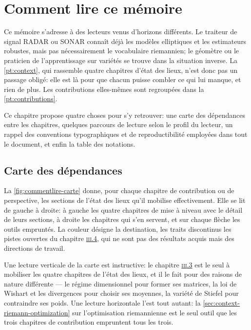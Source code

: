 
\chapter*{Comment lire ce mémoire}
\label{ch:commentlire}

Ce mémoire s'adresse à des lecteurs venus d'horizons différents. Le traiteur de
signal RADAR ou SONAR connaît déjà les modèles elliptiques et les estimateurs
robustes, mais pas nécessairement le vocabulaire riemannien; le géomètre ou le
praticien de l'apprentissage sur variétés se trouve dans la situation inverse.
La \cref{pt:context}, qui rassemble quatre chapitres d'état des lieux, n'est
donc pas un passage obligé: elle est là pour que chacun puisse combler ce qui
lui manque, et rien de plus. Les contributions elles-mêmes sont regroupées dans
la \cref{pt:contributions}.

Ce chapitre propose quatre choses pour s'y retrouver: une carte des dépendances
entre les chapitres, quelques parcours de lecture selon le profil du lecteur, un
rappel des conventions typographiques et de reproductibilité employées dans tout
le document, et enfin la table des notations.

\section*{Carte des dépendances}
\label{sec:commentlire-carte}

La \cref{fig:commentlire-carte} donne, pour chaque chapitre de contribution ou
de perspective, les sections de l'état des lieux qu'il mobilise effectivement.
Elle se lit de gauche à droite: à gauche les quatre chapitres de mise à niveau
avec le détail de leurs sections, à droite les chapitres qui s'en servent, et
sur chaque flèche les outils empruntés. La couleur désigne la destination, les
traits discontinus les pistes ouvertes du chapitre
\hyperref[ch:perspectives]{\textsc{iii}.4}, qui ne sont
pas des résultats acquis mais des directions de travail.

Une lecture verticale de la carte est instructive: le chapitre
\hyperref[ch:spdnet]{\textsc{iii}.3} est le seul à mobiliser les quatre
chapitres de l'état des lieux, et il le fait pour des raisons de nature
différente --- le régime dimensionnel pour former ses matrices, la loi de
Wishart et les divergences pour choisir ses moyennes, la variété de Stiefel pour
contraindre ses poids. Une lecture horizontale l'est tout autant: la
\cref{sec:context-riemann-optimization} sur l'optimisation riemannienne est le
seul outil que les trois chapitres de contribution empruntent tous les trois.

